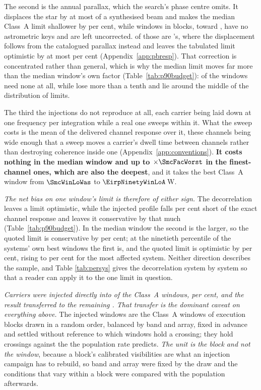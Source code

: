The second is the annual parallax, which the search's phase centre omits. It
displaces the star by at most \SensBeamsMax{} of a synthesised beam and makes
the median Class~A limit shallower by \PxaShiftWinPct{} per cent, while
\PxaNMissing{} windows in \PxaNMissingEb{} blocks, toward
\PxaMissingStars, have no astrometric keys and are left uncorrected.
\PxaNMissingTop{} of those are \PxaMissingTopStar's, where the displacement
follows from the catalogued parallax instead and leaves the tabulated limit
optimistic by at most \BmEpsPxBoundPct{} per cent
(Appendix~\ref{app:pbresp}). That correction is concentrated rather than general, which is
why the median limit moves far more than the median window's own factor
(Table~\ref{tab:p90budget}): \RpPxNNone{} of the \NWinA{} windows need none
at all, while \RpPxNBig{} lose more than a tenth and lie around the middle of
the distribution of limits.

The third the injections do not reproduce at all, each carrier being laid
down at one frequency per integration while a real one sweeps within it. What
the sweep costs is the mean of the delivered channel response over it, these
channels being wide enough that a sweep moves a carrier's dwell time between
channels rather than destroying coherence inside one
(Appendix~\ref{app:conventions}). \textbf{It costs nothing in the median
window and up to $\times\SmcFacWorst$ in the \SmcNAbove{} finest-channel
ones, which are also the deepest}, and it takes the best Class~A window from
$\SmcWinLoWas$ to $\EirpNinetyWinLoA$\,W.

\emph{The net bias on one window's limit is therefore of either sign.} The
decorrelation leaves a limit optimistic, while the injected profile falls
\InjShortPct{} per cent short of the exact channel response and leaves it
conservative by that much (Table~\ref{tab:p90budget}). In the median window
the second is the larger, so the quoted limit is conservative by
\NmNetConsPct{} per cent; at the ninetieth percentile of the systems' own
best windows the first is, and the quoted limit is optimistic by
\NmNetOptPct{} per cent, rising to \NmNetOptMaxPct{} per cent for the most
affected system. Neither direction describes the sample, and Table
\ref{tab:persys} gives the decorrelation system by system so that a reader
can apply it to the one limit in question.

\emph{Carriers were injected directly into \SensNInj{} of the \NWinA{}
Class~A windows, \SensNInjPct{} per cent, and the result transferred to the
remaining \SensNTransfer. That transfer is the dominant caveat on everything
above.} The injected windows are the Class~A windows of execution blocks
drawn in a random order, balanced by band and array, fixed in advance and
settled without reference to which windows hold a crossing; they hold
\SensNCrossAch{} crossings against the \SensNCrossExp{} the population rate
predicts. \emph{The unit is the block and not the window}, because a block's
calibrated visibilities are what an injection campaign has to rebuild, so
band and array were fixed by the draw and the conditions that vary within a
block were compared with the population afterwards.

